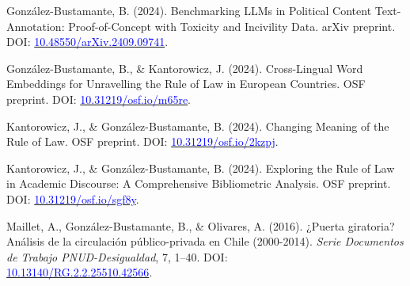 \begin{publications}

\begin{benumerate}{8}

\item{González-Bustamante, B. (2024). Benchmarking LLMs in Political Content Text-Annotation: Proof-of-Concept with Toxicity and Incivility Data. arXiv preprint. DOI: \href{https://doi.org/10.48550/arXiv.2409.09741}{\textcolor{blue}{10.48550/arXiv.2409.09741}}.}\vspace{1mm}

\item{González-Bustamante, B., \& Kantorowicz, J. (2024). Cross-Lingual Word Embeddings for Unravelling the Rule of Law in European Countries. OSF preprint. DOI: \href{https://doi.org/10.31219/osf.io/m65re}{\textcolor{blue}{10.31219/osf.io/m65re}}.}\vspace{1mm}

\item{Kantorowicz, J., \& González-Bustamante, B. (2024). Changing Meaning of the Rule of Law. OSF preprint. DOI: \href{https://doi.org/10.31219/osf.io/2kzpj}{\textcolor{blue}{10.31219/osf.io/2kzpj}}.}\vspace{1mm}

\item{Kantorowicz, J., \& González-Bustamante, B. (2024). Exploring the Rule of Law in Academic Discourse: A Comprehensive Bibliometric Analysis. OSF preprint. DOI: \href{https://doi.org/10.31219/osf.io/sgf8y}{\textcolor{blue}{10.31219/osf.io/sgf8y}}.}\vspace{1mm}


\item{Maillet, A., González-Bustamante, B., \& Olivares, A. (2016). ¿Puerta giratoria? Análisis de la circulación público-privada en Chile (2000-2014). {\itshape Serie Documentos de Trabajo PNUD-Desigualdad}, 7, 1--40. DOI: \\ \href{http://doi.org/10.13140/RG.2.2.25510.42566}{\textcolor{blue}{10.13140/RG.2.2.25510.42566}}.}\vspace{1mm}


\end{benumerate}
\end{publications}
